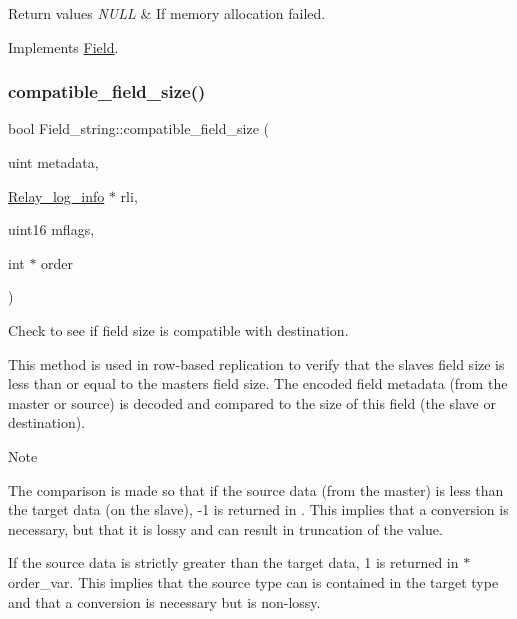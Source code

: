 \begin{DoxyRetVals}{Return values}
{\em N\+U\+LL} & If memory allocation failed. \\
\hline
\end{DoxyRetVals}


Implements \mbox{\hyperlink{classField_a01a9a9aa3a618941e839b1b8793c969d}{Field}}.

\mbox{\label{classField__string_aa3397924d82ab8bb0c954b19c12de9a0}} 
\subsubsection{\texorpdfstring{compatible\+\_\+field\+\_\+size()}{compatible\_field\_size()}}
{\footnotesize\ttfamily bool Field\+\_\+string\+::compatible\+\_\+field\+\_\+size (\begin{DoxyParamCaption}\item[{uint}]{metadata,  }\item[{\mbox{\hyperlink{classRelay__log__info}{Relay\+\_\+log\+\_\+info}} $\ast$}]{rli,  }\item[{uint16}]{mflags,  }\item[{int $\ast$}]{order }\end{DoxyParamCaption})\hspace{0.3cm}{\ttfamily [virtual]}}

Check to see if field size is compatible with destination.

This method is used in row-\/based replication to verify that the slave\textquotesingle{}s field size is less than or equal to the master\textquotesingle{}s field size. The encoded field metadata (from the master or source) is decoded and compared to the size of this field (the slave or destination).

\begin{DoxyNote}{Note}

\end{DoxyNote}
The comparison is made so that if the source data (from the master) is less than the target data (on the slave), -\/1 is returned in {}. This implies that a conversion is necessary, but that it is lossy and can result in truncation of the value.

If the source data is strictly greater than the target data, 1 is returned in {\ttfamily $\ast$order\+\_\+var}. This implies that the source type can is contained in the target type and that a conversion is necessary but is non-\/lossy.

